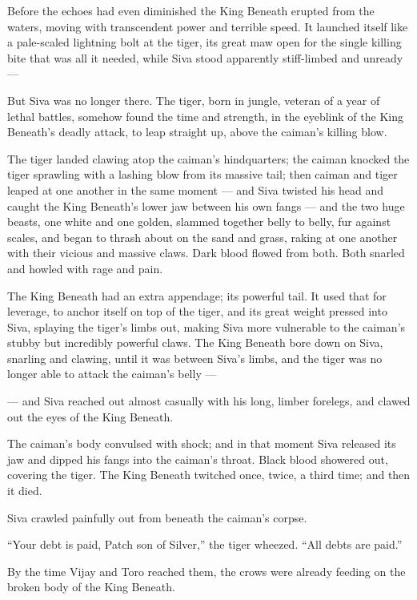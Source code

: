 \documentclass[ebook,oneside,openany,12pt]{memoir}
\begin{document}
Before the echoes had even diminished the King Beneath erupted from
the waters, moving with transcendent power and terrible speed. It
launched itself like a pale-scaled lightning bolt at the tiger, its
great maw open for the single killing bite that was all it needed,
while Siva stood apparently stiff-limbed and unready —

But Siva was no longer there. The tiger, born in jungle, veteran of a
year of lethal battles, somehow found the time and strength, in the
eyeblink of the King Beneath’s deadly attack, to leap straight up,
above the caiman’s killing blow.

The tiger landed clawing atop the caiman’s hindquarters; the caiman
knocked the tiger sprawling with a lashing blow from its massive tail;
then caiman and tiger leaped at one another in the same moment — and
Siva twisted his head and caught the King Beneath’s lower jaw between
his own fangs — and the two huge beasts, one white and one golden,
slammed together belly to belly, fur against scales, and began to
thrash about on the sand and grass, raking at one another with their
vicious and massive claws. Dark blood flowed from both. Both snarled
and howled with rage and pain.

The King Beneath had an extra appendage; its powerful tail. It used
that for leverage, to anchor itself on top of the tiger, and its great
weight pressed into Siva, splaying the tiger’s limbs out, making Siva
more vulnerable to the caiman’s stubby but incredibly powerful
claws. The King Beneath bore down on Siva, snarling and clawing, until
it was between Siva’s limbs, and the tiger was no longer able to
attack the caiman’s belly —

— and Siva reached out almost casually with his long, limber forelegs,
and clawed out the eyes of the King Beneath.

The caiman’s body convulsed with shock; and in that moment Siva
released its jaw and dipped his fangs into the caiman’s throat. Black
blood showered out, covering the tiger. The King Beneath twitched
once, twice, a third time; and then it died.

Siva crawled painfully out from beneath the caiman’s corpse.

“Your debt is paid, Patch son of Silver,” the tiger wheezed. “All
debts are paid.”

By the time Vijay and Toro reached them, the crows were already
feeding on the broken body of the King Beneath.


\chapter{}
\end{document}
